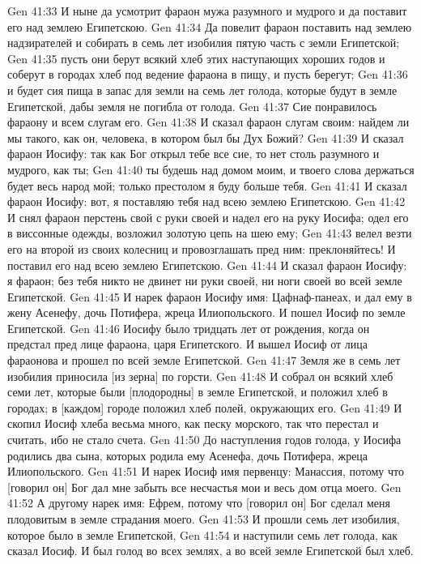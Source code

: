 Gen 41:33  И ныне да усмотрит фараон мужа разумного и мудрого и да поставит его над землею Египетскою.
Gen 41:34  Да повелит фараон поставить над землею надзирателей и собирать в семь лет изобилия пятую часть с земли Египетской;
Gen 41:35  пусть они берут всякий хлеб этих наступающих хороших годов и соберут в городах хлеб под ведение фараона в пищу, и пусть берегут;
Gen 41:36  и будет сия пища в запас для земли на семь лет голода, которые будут в земле Египетской, дабы земля не погибла от голода.
Gen 41:37  Сие понравилось фараону и всем слугам его.
Gen 41:38  И сказал фараон слугам своим: найдем ли мы такого, как он, человека, в котором был бы Дух Божий?
Gen 41:39  И сказал фараон Иосифу: так как Бог открыл тебе все сие, то нет столь разумного и мудрого, как ты;
Gen 41:40  ты будешь над домом моим, и твоего слова держаться будет весь народ мой; только престолом я буду больше тебя.
Gen 41:41  И сказал фараон Иосифу: вот, я поставляю тебя над всею землею Египетскою.
Gen 41:42  И снял фараон перстень свой с руки своей и надел его на руку Иосифа; одел его в виссонные одежды, возложил золотую цепь на шею ему;
Gen 41:43  велел везти его на второй из своих колесниц и провозглашать пред ним: преклоняйтесь! И поставил его над всею землею Египетскою.
Gen 41:44  И сказал фараон Иосифу: я фараон; без тебя никто не двинет ни руки своей, ни ноги своей во всей земле Египетской.
Gen 41:45  И нарек фараон Иосифу имя: Цафнаф-панеах, и дал ему в жену Асенефу, дочь Потифера, жреца Илиопольского. И пошел Иосиф по земле Египетской.
Gen 41:46  Иосифу было тридцать лет от рождения, когда он предстал пред лице фараона, царя Египетского. И вышел Иосиф от лица фараонова и прошел по всей земле Египетской.
Gen 41:47  Земля же в семь лет изобилия приносила [из зерна] по горсти.
Gen 41:48  И собрал он всякий хлеб семи лет, которые были [плодородны] в земле Египетской, и положил хлеб в городах; в [каждом] городе положил хлеб полей, окружающих его.
Gen 41:49  И скопил Иосиф хлеба весьма много, как песку морского, так что перестал и считать, ибо не стало счета.
Gen 41:50  До наступления годов голода, у Иосифа родились два сына, которых родила ему Асенефа, дочь Потифера, жреца Илиопольского.
Gen 41:51  И нарек Иосиф имя первенцу: Манассия, потому что [говорил он] Бог дал мне забыть все несчастья мои и весь дом отца моего.
Gen 41:52  А другому нарек имя: Ефрем, потому что [говорил он] Бог сделал меня плодовитым в земле страдания моего.
Gen 41:53  И прошли семь лет изобилия, которое было в земле Египетской,
Gen 41:54  и наступили семь лет голода, как сказал Иосиф. И был голод во всех землях, а во всей земле Египетской был хлеб.
